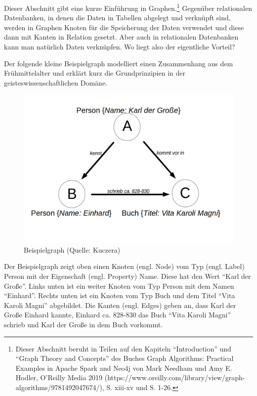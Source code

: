 \documentclass[ngerman,]{scrreprt}
\begin{document}
Dieser Abschnitt gibt eine kurze Einführung in Graphen.\footnote{Dieser Abschnitt beruht in Teilen auf den Kapiteln ``Introduction'' und ``Graph Theory and Concepts'' des Buches Graph Algorithms: Practical Examples in Apache Spark and Neo4j von Mark Needham und Amy E. Hodler, O'Reilly Media 2019 (https://www.oreilly.com/library/view/graph-algorithms/9781492047674/), S. xiii-xv und S. 1-26.} Gegenüber relationalen Datenbanken, in denen die Daten in Tabellen abgelegt und verknüpft sind, werden in Graphen Knoten für die Speicherung der Daten verwendet und diese dann mit Kanten in Relation gesetzt. Aber auch in relationalen Datenbanken kann man natürlich Daten verknüpfen. Wo liegt also der eigentliche Vorteil?

Der folgende kleine Beispielgraph modelliert einen Zusammenhang aus dem Frühmittelalter und erklärt kurz die Grundprinzipien in der geisteswissenschaftlichen Domäne.

\begin{figure}
\centering
\includegraphics{Bilder/Beispielgraph.png}
\caption{Beispielgraph (Quelle: Kuczera)}
\end{figure}

Der Beispielgraph zeigt oben einen Knoten (engl. Node) vom Typ (engl. Label) Person mit der Eigenschaft (engl. Property) Name. Diese hat den Wert ``Karl der Große''. Links unten ist ein weiter Knoten vom Typ Person mit dem Namen ``Einhard''. Rechts unten ist ein Knoten vom Typ Buch und dem Titel ``Vita Karoli Magni'' abgebildet. Die Kanten (engl. Edges) geben an, dass Karl der Große Einhard kannte, Einhard ca. 828-830 das Buch ``Vita Karoli Magni'' schrieb und Karl der Große in dem Buch vorkommt.
\end{document}
